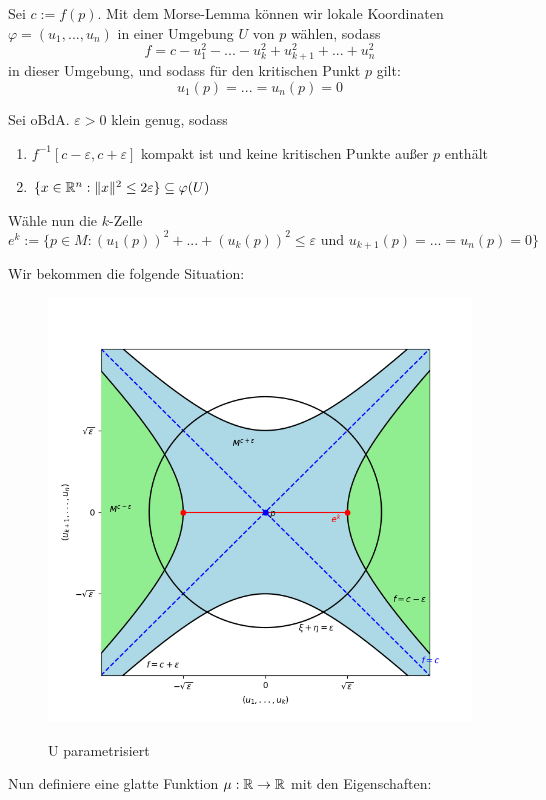 \begin{bigproof}
    Sei $c := f(p)$. Mit dem Morse-Lemma können wir lokale Koordinaten 
    $\varphi = (u_1, ..., u_n)$ in einer Umgebung $U$ von $p$ wählen, sodass
    \[ f = c - u_1^2 - ... - u_k^2 + u_{k+1}^2 + ... + u_n^2 \]
    in dieser Umgebung, und sodass für den kritischen Punkt $p$ gilt:
    \[ u_1(p) = ... = u_n(p) = 0 \]

    Sei oBdA. $\varepsilon > 0$ klein genug, sodass 
    \begin{enumerate}
        \item $f^{-1}[c - \varepsilon, c + \varepsilon]$ kompakt ist und keine
            kritischen Punkte außer $p$ enthält
        \item $\{ x \in { \mathbb R }^n: \lVert x \rVert^2 \leq 2 \varepsilon \} \subseteq \varphi(U) $
    \end{enumerate}

    Wähle nun die $k$-Zelle 
    \[ 
        e^k := \{ p \in M: (u_1(p))^2 + ... + (u_k(p))^2 \leq \varepsilon 
        \text{ und } u_{k+1}(p) = ... = u_n(p) = 0 \} 
    \]

    Wir bekommen die folgende Situation:

    \begin{figure}[H]
        \centering
        \includegraphics[width=0.8\linewidth]{../resources/Me-Diagram6-U-parameterized.png}
        \label{fig:me-diagram6}
        \caption{U parametrisiert}
    \end{figure}

    Nun definiere eine glatte Funktion $\mu: { \mathbb R } \to { \mathbb R }$ mit den Eigenschaften:


\end{bigproof}

